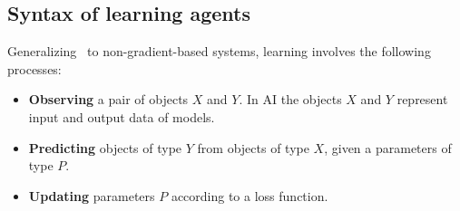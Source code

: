 \subsection{Syntax of learning agents}
\label{sec:learning-agent}
Generalizing~\citet{cruttwell2022categorical} to non-gradient-based systems, learning involves the following processes:
\begin{itemize}
    \item \textbf{Observing} a pair of objects $X$ and $Y$. In AI the objects $X$ and $Y$ represent input and output data of models.
    \item \textbf{Predicting} objects of type $Y$ from objects of type $X$, given a parameters of type $P$.
    \item \textbf{Updating} parameters $P$ according to a loss function. 
\end{itemize}


